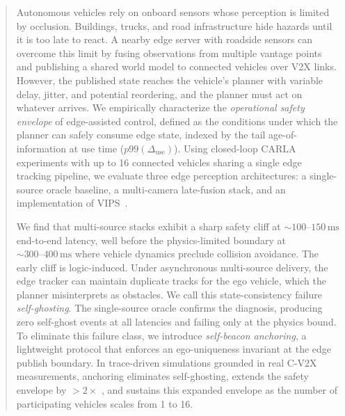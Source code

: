 \begin{abstract}


Autonomous vehicles rely on onboard sensors whose perception is limited by occlusion. Buildings, trucks, and road infrastructure hide hazards until it is too late to react. A nearby edge server with roadside sensors can overcome this limit by fusing observations from multiple vantage points and publishing a shared world model to connected vehicles over V2X links. However, the published state reaches the vehicle's planner with variable delay, jitter, and potential reordering, and the planner must act on whatever arrives. We empirically characterize the \emph{operational safety envelope} of edge-assisted control, defined as the conditions under which the planner can safely consume edge state, indexed by the tail age-of-information at use time ($p99(\Delta_{\mathrm{use}})$). Using closed-loop CARLA experiments with up to 16 connected vehicles sharing a single edge tracking pipeline, we evaluate three edge perception architectures: a single-source oracle baseline, a multi-camera late-fusion stack, and an implementation of VIPS~\cite{vips2022}.

We find that multi-source stacks exhibit a sharp safety cliff at ${\sim}100\text{--}150\,\mathrm{ms}$ end-to-end latency, well before the physics-limited boundary at ${\sim}300\text{--}400\,\mathrm{ms}$ where vehicle dynamics preclude collision avoidance. The early cliff is logic-induced. Under asynchronous multi-source delivery, the edge tracker can maintain duplicate tracks for the ego vehicle, which the planner misinterprets as obstacles. We call this state-consistency failure \emph{self-ghosting}. The single-source oracle confirms the diagnosis, producing zero self-ghost events at all latencies and failing only at the physics bound. To eliminate this failure class, we introduce \emph{self-beacon anchoring}, a lightweight protocol that enforces an ego-uniqueness invariant at the edge publish boundary. In trace-driven simulations grounded in real C-V2X measurements, anchoring eliminates self-ghosting, extends the safety envelope by ${>}2{\times}$ %
, and sustains this expanded envelope as the number of participating vehicles scales from 1 to 16.


\end{abstract}